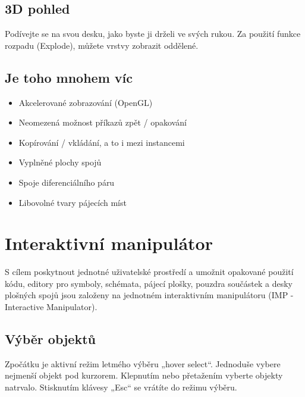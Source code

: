\documentclass[letterpaper,10pt,czech]{sphinxmanual}
\begin{document}
\noindent{}


\section{3D pohled}
\label{\detokenize{feature-overview_cz:d-pohled}}
Podívejte se na svou desku, jako byste ji drželi ve svých rukou. Za použití funkce rozpadu (Explode), můžete vrstvy zobrazit oddělené.

\noindent{}


\section{Je toho mnohem víc}
\label{\detokenize{feature-overview_cz:je-toho-mnohem-vic}}\begin{itemize}
\item {} 
Akcelerované zobrazování (OpenGL)

\item {} 
Neomezená možnost příkazů zpět / opakování

\item {} 
Kopírování / vkládání, a to i mezi instancemi

\item {} 
Vyplněné plochy spojů

\item {} 
Spoje diferenciálního páru

\item {} 
Libovolné tvary pájecích míst

\end{itemize}


\chapter{Interaktivní manipulátor}
\label{\detokenize{imp_cz:interaktivni-manipulator}}\label{\detokenize{imp_cz::doc}}
S cílem poskytnout jednotné uživatelské prostředí a umožnit opakované použití kódu,
editory pro symboly, schémata, pájecí plošky, pouzdra součástek a desky plošných spojů jsou založeny na jednotném interaktivním manipulátoru (IMP - Interactive Manipulator).


\section{Výběr objektů}
\label{\detokenize{imp_cz:vyber-objektu}}
Zpočátku je aktivní režim letmého výběru „hover select“. Jednoduše vybere
nejmenší objekt pod kurzorem. Klepnutím nebo přetažením vyberte objekty
natrvalo. Stisknutím klávesy „Esc“ se vrátíte do režimu výběru.
\end{document}
